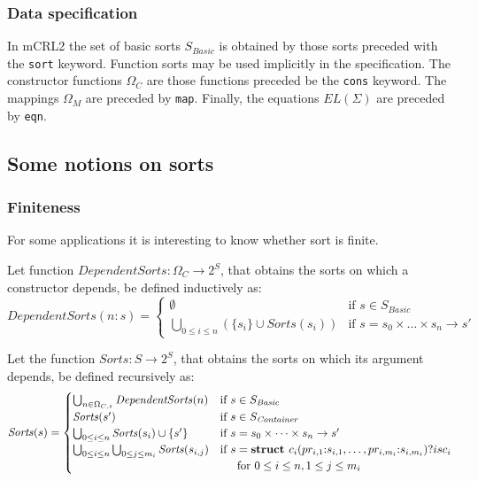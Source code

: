 \documentclass[a4paper,11pt]{article}
\newcommand{\f}[1]{{\mathit{#1}}}
\newcommand{\basicsort}{{S_{\mathit{Basic}}}}
\newcommand{\containersort}{{S_{\mathit{Container}}}}
\begin{document}
\subsubsection{Data specification}
In mCRL2 the set of basic sorts $\basicsort$ is obtained by those sorts preceded with the \lstinline{sort} keyword. Function sorts may be used implicitly in the specification. The constructor functions $\Omega_C$ are those functions preceded be the \lstinline{cons} keyword. The mappings $\Omega_M$ are preceded by \lstinline{map}. Finally, the equations $EL(\Sigma)$ are preceded by \lstinline{eqn}.

\subsection{Some notions on sorts}\label{sec:sort_notions}
\subsubsection{Finiteness}\label{sec:sort_finiteness}
For some applications it is interesting to know whether sort is finite.

Let function $\f{DependentSorts}: \Omega_C \rightarrow 2^S$, that obtains the sorts on which a constructor depends, be defined inductively as:
\begin{equation*}
 \f{DependentSorts}(n{:}s) = \begin{cases}
             \emptyset & \text{if $s \in \basicsort$}\\
             \bigcup_{0 \leq i \leq n}(\{ s_i \} \cup \f{Sorts}(s_i)) & \text{if $s = s_0 \times \dots \times s_n \rightarrow s'$}
            \end{cases}
\end{equation*}

Let the function $\f{Sorts}: S \rightarrow 2^S$, that obtains the sorts on which its argument depends, be defined recursively as:
\begin{equation*}
 \f{Sorts}(s) = \begin{cases}
             \bigcup_{n \in \Omega_{C,s}} \f{DependentSorts}(n) & \text{if $s \in \basicsort$}\\
             \f{Sorts}(s') & \text{if $s \in \containersort$}\\
             \bigcup_{0 \leq i \leq n} \f{Sorts}(s_i) \cup \{ s' \} & \text{if $s = s_0 \times \dots \times s_n \rightarrow s'$}\\
             \bigcup_{0 \leq i \leq n} \bigcup_{0 \leq j \leq m_i} \f{Sorts}(s_{i,j}) & \text{if $s = \textbf{struct } c_i(pr_{i,1}{:}s_{i,1}, \dots, pr_{i,m_i}{:}s_{i,m_i})?isc_i$}\\&\text{\indent for $0 \leq i \leq n, 1 \leq j \leq m_i$}
            \end{cases}
\end{equation*}
\end{document}
